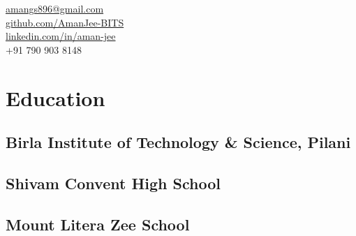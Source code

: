 \documentclass[]{barua-resume-openfont}
\begin{document}
\linespread{1.0}



{
  \faEnvelope \href{mailto:amangs896@gmail.com}{  amangs896@gmail.com}\\
  \faGithub \href{https://github.com/AmanJee-BITS}{  github.com/AmanJee-BITS}\\
  \faLinkedinSquare\href{https://www.linkedin.com/in/aman-jee-ab0a52166/}{  linkedin.com/in/aman-jee}\\
  +91 790 903 8148
}



\begin{minipage}[t]{0.32\textwidth}


\section{Education}

\subsection{Birla Institute of Technology \& Science, Pilani}

\sectionsep

\subsection{Shivam Convent High School}

\sectionsep

\subsection{Mount Litera Zee School}
\sectionsep





\end{minipage}
\end{document}
